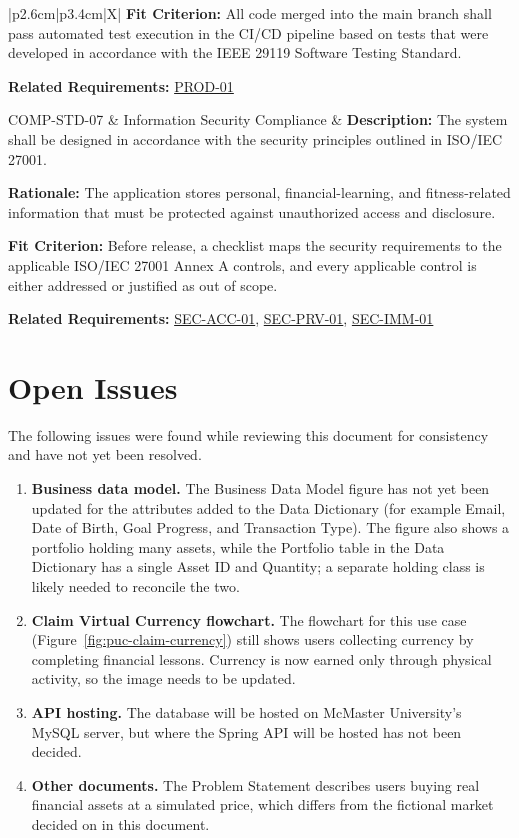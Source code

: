 \documentclass[12pt]{article}
\begin{document}
\begin{xltabular}{\textwidth}{|p{2.6cm}|p{3.4cm}|X|}
\textbf{Fit Criterion:} All code merged into the main branch shall pass automated test execution in the CI/CD pipeline based on tests that were developed in accordance with the IEEE 29119 Software Testing Standard.

\textbf{Related Requirements:} \hyperlink{req:PROD-01}{PROD-01}\\
\hline

COMP-STD-07\hypertarget{req:COMP-STD-07}{} & 
Information Security Compliance & 
\textbf{Description:} The system shall be designed in accordance with the security principles outlined in ISO/IEC 27001. 

\textbf{Rationale:} The application stores personal, financial-learning, and fitness-related information that must be protected against unauthorized access and disclosure. 

\textbf{Fit Criterion:} Before release, a checklist maps the security requirements to the applicable ISO/IEC 27001 Annex A controls, and every applicable control is either addressed or justified as out of scope.

\textbf{Related Requirements:} \hyperlink{req:SEC-ACC-01}{SEC-ACC-01}, \hyperlink{req:SEC-PRV-01}{SEC-PRV-01}, \hyperlink{req:SEC-IMM-01}{SEC-IMM-01}\\
\hline

\end{xltabular}

\section{Open Issues}

The following issues were found while reviewing this document for consistency
and have not yet been resolved.

\begin{enumerate}
  \item \textbf{Business data model.} The Business Data Model figure has not yet
  been updated for the attributes added to the Data Dictionary (for example
  Email, Date of Birth, Goal Progress, and Transaction Type). The figure also
  shows a portfolio holding many assets, while the Portfolio table in the Data
  Dictionary has a single Asset ID and Quantity; a separate holding class is
  likely needed to reconcile the two.
  \item \textbf{Claim Virtual Currency flowchart.} The flowchart for this use
  case (Figure~\ref{fig:puc-claim-currency}) still shows users collecting
  currency by completing financial lessons. Currency is now earned only through
  physical activity, so the image needs to be updated.
  \item \textbf{API hosting.} The database will be hosted on McMaster
  University's MySQL server, but where the Spring API will be hosted has not
  been decided.
  \item \textbf{Other documents.} The Problem Statement describes users buying
  real financial assets at a simulated price, which differs from the fictional
  market decided on in this document.
\end{enumerate}
\end{document}
